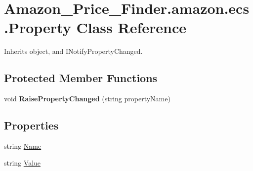\hypertarget{class_amazon___price___finder_1_1amazon_1_1ecs_1_1_property}{\section{Amazon\-\_\-\-Price\-\_\-\-Finder.\-amazon.\-ecs.\-Property Class Reference}
\label{class_amazon___price___finder_1_1amazon_1_1ecs_1_1_property}
}


 




Inherits object, and I\-Notify\-Property\-Changed.

\subsection*{Protected Member Functions}
\begin{DoxyCompactItemize}
\item 
\hypertarget{class_amazon___price___finder_1_1amazon_1_1ecs_1_1_property_ac7df6d444b1689dc1859de9012021bb3}{void {\bfseries Raise\-Property\-Changed} (string property\-Name)}\label{class_amazon___price___finder_1_1amazon_1_1ecs_1_1_property_ac7df6d444b1689dc1859de9012021bb3}

\end{DoxyCompactItemize}
\subsection*{Properties}
\begin{DoxyCompactItemize}
\item 
\hypertarget{class_amazon___price___finder_1_1amazon_1_1ecs_1_1_property_acff4e02d9aaf7129468cf598c3c64d2b}{string \hyperlink{class_amazon___price___finder_1_1amazon_1_1ecs_1_1_property_acff4e02d9aaf7129468cf598c3c64d2b}{Name}}\label{class_amazon___price___finder_1_1amazon_1_1ecs_1_1_property_acff4e02d9aaf7129468cf598c3c64d2b}

\begin{DoxyCompactList}\small\item\em \end{DoxyCompactList}\item 
\hypertarget{class_amazon___price___finder_1_1amazon_1_1ecs_1_1_property_a50593cd5a38d6691a67d90151ca060e0}{string \hyperlink{class_amazon___price___finder_1_1amazon_1_1ecs_1_1_property_a50593cd5a38d6691a67d90151ca060e0}{Value}}\label{class_amazon___price___finder_1_1amazon_1_1ecs_1_1_property_a50593cd5a38d6691a67d90151ca060e0}

\begin{DoxyCompactList}\small\item\em \end{DoxyCompactList}\end{DoxyCompactItemize}
